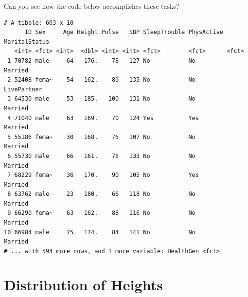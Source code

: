 \documentclass[
]{book}
\newenvironment{Shaded}{\begin{snugshade}}{\end{snugshade}}
\newcommand{\CommentTok}[1]{\textcolor[rgb]{0.56,0.35,0.01}{\textit{#1}}}
\newcommand{\DataTypeTok}[1]{\textcolor[rgb]{0.13,0.29,0.53}{#1}}
\newcommand{\DecValTok}[1]{\textcolor[rgb]{0.00,0.00,0.81}{#1}}
\newcommand{\KeywordTok}[1]{\textcolor[rgb]{0.13,0.29,0.53}{\textbf{#1}}}
\newcommand{\NormalTok}[1]{#1}
\newcommand{\OperatorTok}[1]{\textcolor[rgb]{0.81,0.36,0.00}{\textbf{#1}}}
\newcommand{\StringTok}[1]{\textcolor[rgb]{0.31,0.60,0.02}{#1}}
\begin{document}
Can you see how the code below accomplishes these tasks?

\begin{Shaded}
\end{Shaded}

\begin{verbatim}
# A tibble: 603 x 10
      ID Sex     Age Height Pulse   SBP SleepTrouble PhysActive MaritalStatus
   <int> <fct> <int>  <dbl> <int> <int> <fct>        <fct>      <fct>        
 1 70782 male     64   176.    78   127 No           No         Married      
 2 52408 fema~    54   162.    80   135 No           No         LivePartner  
 3 64530 male     53   185.   100   131 No           No         Married      
 4 71040 male     63   169.    70   124 Yes          Yes        Married      
 5 55186 fema~    30   168.    76   107 No           No         Married      
 6 55730 male     66   161.    78   133 No           No         Married      
 7 68229 fema~    36   170.    90   105 No           Yes        Married      
 8 63762 male     23   180.    66   118 No           No         Married      
 9 66290 fema~    63   162.    88   116 No           No         Married      
10 66984 male     75   174.    84   141 No           No         Married      
# ... with 593 more rows, and 1 more variable: HealthGen <fct>
\end{verbatim}

\hypertarget{distribution-of-heights}{%
\section{Distribution of Heights}\label{distribution-of-heights}}
\end{document}
